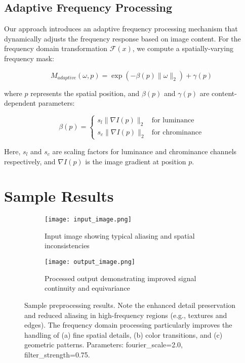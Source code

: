 \documentclass{article}
\begin{document}
\subsection{Adaptive Frequency Processing}
Our approach introduces an adaptive frequency processing mechanism that dynamically adjusts the frequency response based on image content. For the frequency domain transformation $\mathcal{F}(x)$, we compute a spatially-varying frequency mask:

\begin{equation}
M_{adaptive}(\omega, p) = \exp(-\beta(p)\|\omega\|_2) + \gamma(p)
\end{equation}

where $p$ represents the spatial position, and $\beta(p)$ and $\gamma(p)$ are content-dependent parameters:

\begin{equation}
\beta(p) = \begin{cases}
s_l\|∇I(p)\|_2 & \text{for luminance} \\
s_c\|∇I(p)\|_2 & \text{for chrominance}
\end{cases}
\end{equation}

Here, $s_l$ and $s_c$ are scaling factors for luminance and chrominance channels respectively, and $∇I(p)$ is the image gradient at position $p$.

\section{Sample Results}
\begin{figure}[htbp]
\centering
\begin{subfigure}[b]{0.45\textwidth}
    \centering
    \texttt{[image: input\_image.png]}
    \caption{Input image showing typical aliasing and spatial inconsistencies}
    \label{fig:input}
\end{subfigure}
\hfill
\begin{subfigure}[b]{0.45\textwidth}
    \centering
    \texttt{[image: output\_image.png]}
    \caption{Processed output demonstrating improved signal continuity and equivariance}
    \label{fig:output}
\end{subfigure}
\caption{Sample preprocessing results. Note the enhanced detail preservation and reduced aliasing in high-frequency regions (e.g., textures and edges). The frequency domain processing particularly improves the handling of (a) fine spatial details, (b) color transitions, and (c) geometric patterns. Parameters: fourier\_scale=2.0, filter\_strength=0.75.}
\label{fig:sample_results}
\end{figure}
\end{document}
